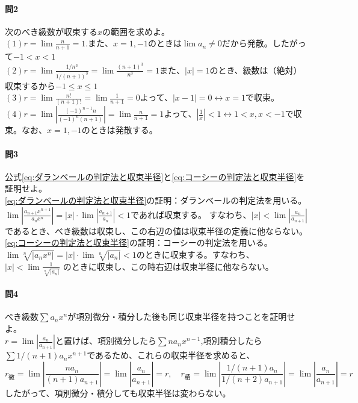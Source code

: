 \documentclass[a4j,dvipdfmx]{jsarticle}
\begin{document}
                \paragraph{問2}次のべき級数が収束する$x$の範囲を求めよ。\\
                    $\displaystyle(1)r=\lim\frac{n}{n+1}=1.$また、$x=1,-1$のときは$\lim a_n\neq 0$だから発散。したがって$-1<x<1$\\
                    $\displaystyle(2)r=\lim\frac{1/n^3}{1/(n+1)^3}=\lim\frac{(n+1)^3}{n^3}=1$また、$|x|=1$のとき、級数は（絶対）収束するから$-1\leq x\leq 1$\\
                    $\displaystyle(3)r=\lim\frac{n!}{(n+1)!}=\lim\frac{1}{n+1}=0$よって、$|x-1|=0\leftrightarrow x=1$で収束。\\
                    $\displaystyle(4)r=\lim\left|\frac{(-1)^{n-1}n}{(-1)^n(n+1)}\right|=\lim\frac{n}{n+1}=1$よって、$\left|\frac{1}{x}\right|<1\leftrightarrow 1<x,x<-1$で収束。なお、$x=1,-1$のときは発散する。
                
                \paragraph{問3}公式\eqref{eq:ダランベールの判定法と収束半径}と\eqref{eq:コーシーの判定法と収束半径}を証明せよ。\\

                \eqref{eq:ダランベールの判定法と収束半径}の証明：ダランベールの判定法を用いる。$\displaystyle\lim \left|\frac{a_{n+1}x^{n+1}}{a_nx^n}\right|=|x|\cdot\lim\left|\frac{a_{n+1}}{a_n}\right|<1$であれば収束する。
                すなわち、$\displaystyle|x|<\lim \left|\frac{a_n}{a_{n+1}}\right|$であるとき、べき級数は収束し、この右辺の値は収束半径の定義に他ならない。\\

                \eqref{eq:コーシーの判定法と収束半径}の証明：コーシーの判定法を用いる。$\lim \sqrt[n]{|a_nx^n|}=|x|\cdot \lim\sqrt[n]{|a_n|}<1$のときに収束する。すなわち、$\displaystyle |x| < \lim\frac{1}{\sqrt[n]{|a_n|}}$
                のときに収束し、この時右辺は収束半径に他ならない。

                \paragraph{問4}べき級数$\sum a_nx^n$が項別微分・積分した後も同じ収束半径を持つことを証明せよ。\\
                $\displaystyle r=\lim\left|\frac{a_n}{a_{n+1}}\right|$と置けば、項別微分したら$\sum na_n x^{n-1}$,項別積分したら$\sum 1/(n+1)a_nx^{n+1}$であるため、これらの収束半径を求めると、
                \begin{equation*}
                    r_{\text{微}}=\lim\left|\frac{na_n}{(n+1)a_{n+1}}\right|=\lim\left|\frac{a_n}{a_{n+1}}\right|=r,\quad r_{\text{積}}=\lim \left|\frac{1/(n+1)a_n}{1/(n+2)a_{n+1}}\right|=\lim\left|\frac{a_n}{a_{n+1}}\right|=r
                \end{equation*}
                したがって、項別微分・積分しても収束半径は変わらない。
\end{document}
